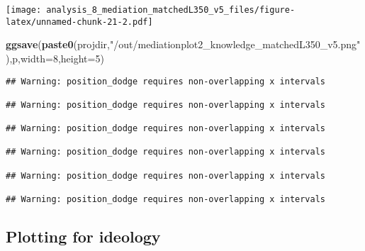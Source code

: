 \documentclass[
]{article}
\newenvironment{Shaded}{\begin{snugshade}}{\end{snugshade}}
\newcommand{\DataTypeTok}[1]{\textcolor[rgb]{0.13,0.29,0.53}{#1}}
\newcommand{\DecValTok}[1]{\textcolor[rgb]{0.00,0.00,0.81}{#1}}
\newcommand{\KeywordTok}[1]{\textcolor[rgb]{0.13,0.29,0.53}{\textbf{#1}}}
\newcommand{\NormalTok}[1]{#1}
\newcommand{\StringTok}[1]{\textcolor[rgb]{0.31,0.60,0.02}{#1}}
\begin{document}
\texttt{[image: analysis\_8\_mediation\_matchedL350\_v5\_files/figure-latex/unnamed-chunk-21-2.pdf]}

\begin{Shaded}
\begin{Highlighting}[]
\KeywordTok{ggsave}\NormalTok{(}\KeywordTok{paste0}\NormalTok{(projdir,}\StringTok{"/out/mediationplot2_knowledge_matchedL350_v5.png"}\NormalTok{),p,}\DataTypeTok{width=}\DecValTok{8}\NormalTok{,}\DataTypeTok{height=}\DecValTok{5}\NormalTok{)}
\end{Highlighting}
\end{Shaded}

\begin{verbatim}
## Warning: position_dodge requires non-overlapping x intervals

## Warning: position_dodge requires non-overlapping x intervals

## Warning: position_dodge requires non-overlapping x intervals

## Warning: position_dodge requires non-overlapping x intervals

## Warning: position_dodge requires non-overlapping x intervals

## Warning: position_dodge requires non-overlapping x intervals
\end{verbatim}

\hypertarget{plotting-for-ideology}{%
\subsection{Plotting for ideology}\label{plotting-for-ideology}}
\end{document}
